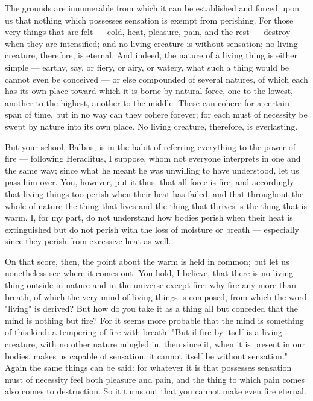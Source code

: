  The grounds are innumerable from which it can be established and forced upon us that nothing which possesses sensation is exempt from perishing. For those very things that are felt — cold, heat, pleasure, pain, and the rest — destroy when they are intensified; and no living creature is without sensation; no living creature, therefore, is eternal. And indeed, the nature of a living thing is either simple — earthy, say, or fiery, or airy, or watery, what such a thing would be cannot even be conceived — or else compounded of several natures, of which each has its own place toward which it is borne by natural force, one to the lowest, another to the highest, another to the middle. These can cohere for a certain span of time, but in no way can they cohere forever; for each must of necessity be swept by nature into its own place. No living creature, therefore, is everlasting.

 But your school, Balbus, is in the habit of referring everything to the power of fire — following Heraclitus, I suppose, whom not everyone interprets in one and the same way; since what he meant he was unwilling to have understood, let us pass him over. You, however, put it thus: that all force is fire, and accordingly that living things too perish when their heat has failed, and that throughout the whole of nature the thing that lives and the thing that thrives is the thing that is warm. I, for my part, do not understand how bodies perish when their heat is extinguished but do not perish with the loss of moisture or breath — especially since they perish from excessive heat as well.

 On that score, then, the point about the warm is held in common; but let us nonetheless see where it comes out. You hold, I believe, that there is no living thing outside in nature and in the universe except fire: why fire any more than breath, of which the very mind of living things is composed, from which the word "living" is derived? But how do you take it as a thing all but conceded that the mind is nothing but fire? For it seems more probable that the mind is something of this kind: a tempering of fire with breath. "But if fire by itself is a living creature, with no other nature mingled in, then since it, when it is present in our bodies, makes us capable of sensation, it cannot itself be without sensation." Again the same things can be said: for whatever it is that possesses sensation must of necessity feel both pleasure and pain, and the thing to which pain comes also comes to destruction. So it turns out that you cannot make even fire eternal.

